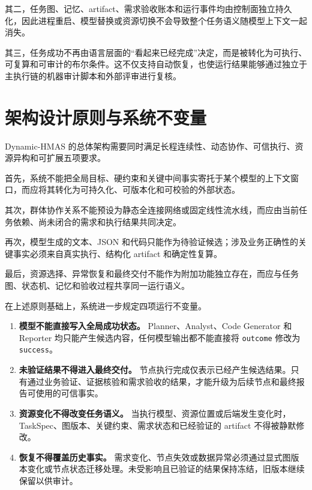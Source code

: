 \documentclass[UTF8,a4paper,12pt,oneside]{ctexbook}
\begin{document}
其二，任务图、记忆、artifact、需求验收账本和运行事件均由控制面独立持久化，因此进程重启、模型替换或资源切换不会导致整个任务语义随模型上下文一起消失。

其三，任务成功不再由语言层面的“看起来已经完成”决定，而是被转化为可执行、可复算和可审计的布尔条件。这不仅支持自动恢复，也使运行结果能够通过独立于主执行链的机器审计脚本和外部评审进行复核。


\section{架构设计原则与系统不变量}

Dynamic-HMAS 的总体架构需要同时满足长程连续性、动态协作、可信执行、资源异构和可扩展五项要求。

首先，系统不能把全局目标、硬约束和关键中间事实寄托于某个模型的上下文窗口，而应将其转化为可持久化、可版本化和可校验的外部状态。

其次，群体协作关系不能预设为静态全连接网络或固定线性流水线，而应由当前任务依赖、尚未闭合的需求和执行结果共同决定。

再次，模型生成的文本、JSON 和代码只能作为待验证候选；涉及业务正确性的关键事实必须来自真实执行、结构化 artifact 和确定性复算。

最后，资源选择、异常恢复和最终交付不能作为附加功能独立存在，而应与任务图、状态机、记忆和验收过程共享同一运行语义。

在上述原则基础上，系统进一步规定四项运行不变量。

\begin{enumerate}
    \item \textbf{模型不能直接写入全局成功状态。}
    Planner、Analyst、Code Generator 和 Reporter 均只能产生候选内容，任何模型输出都不能直接将 \texttt{outcome} 修改为 \texttt{success}。

    \item \textbf{未验证结果不得进入最终交付。}
    节点执行完成仅表示已经产生候选结果。只有通过业务验证、证据核验和需求验收的结果，才能升级为后续节点和最终报告可使用的可信事实。

    \item \textbf{资源变化不得改变任务语义。}
    当执行模型、资源位置或后端发生变化时，TaskSpec、图版本、关键约束、需求状态和已经验证的 artifact 不得被静默修改。

    \item \textbf{恢复不得覆盖历史事实。}
    需求变化、节点失效或数据异常必须通过显式图版本变化或节点状态迁移处理。未受影响且已验证的结果保持冻结，旧版本继续保留以供审计。
\end{enumerate}
\end{document}
